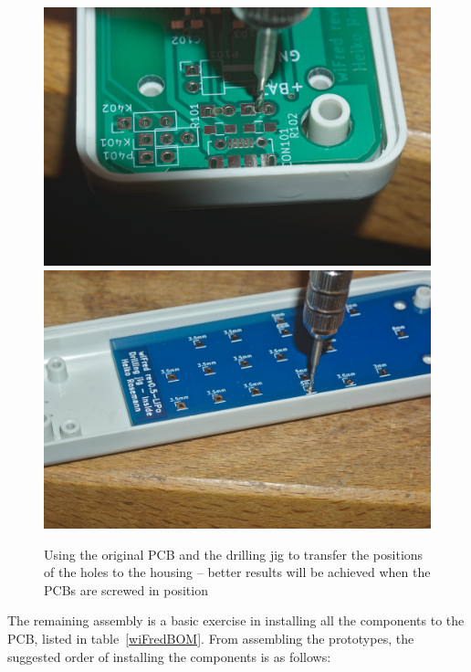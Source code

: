 \documentclass[11pt,a4paper]{scrartcl}
\begin{document}
\begin{figure}[tbh]
  \centering
  \includegraphics[width=0.49 \textwidth]{images/_DSC0124}
  \includegraphics[width=0.49 \textwidth]{images/_DSC0128}
  \caption{Using the original PCB and the drilling jig to transfer the positions of the holes to the housing -- better results will be achieved when the PCBs are screwed in position}
  \label{transferHoles}
\end{figure}

The remaining assembly is a basic exercise in installing all the components to the PCB, listed in table~\ref{wiFredBOM}. From assembling the prototypes, the suggested order of installing the components is as follows:
\end{document}

